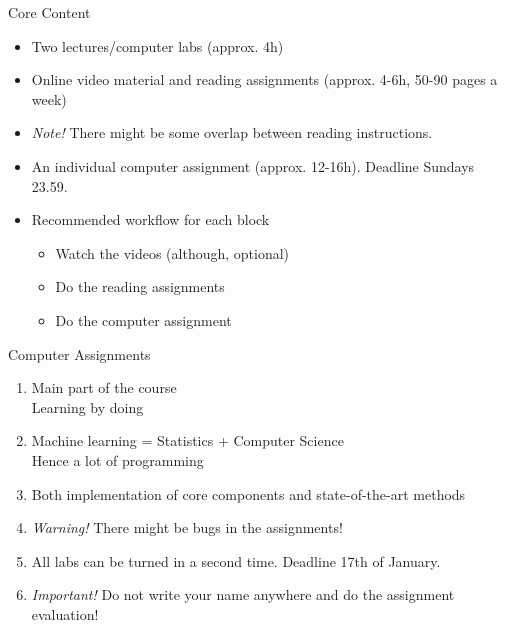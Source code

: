 \documentclass[10pt,handout]{beamer}
\begin{document}
\begin{frame}{Core Content}

\begin{itemize}
\item Two lectures/computer labs (approx. 4h)
\item Online video material and reading assignments (approx. 4-6h, 50-90 pages a week)
\item \emph{Note!} There might be some overlap between reading instructions.
\item An individual computer assignment (approx. 12-16h). Deadline Sundays 23.59.\pause
\item Recommended workflow for each block
\begin{itemize}
\item Watch the videos (although, optional)
\item Do the reading assignments
\item Do the computer assignment
\end{itemize}
\end{itemize}

\end{frame}


\begin{frame}{Computer Assignments}

\begin{enumerate}
\item Main part of the course\\Learning by doing
\item Machine learning = Statistics + Computer Science\\Hence a lot of programming\pause
\item Both implementation of core components and state-of-the-art methods\pause
\item \emph{Warning!} There might be bugs in the assignments!\pause
\item All labs can be turned in a second time. Deadline 17th of January.
\item \emph{Important!} Do not write your name anywhere and do the assignment evaluation!
\end{enumerate}

\end{frame}
\end{document}
